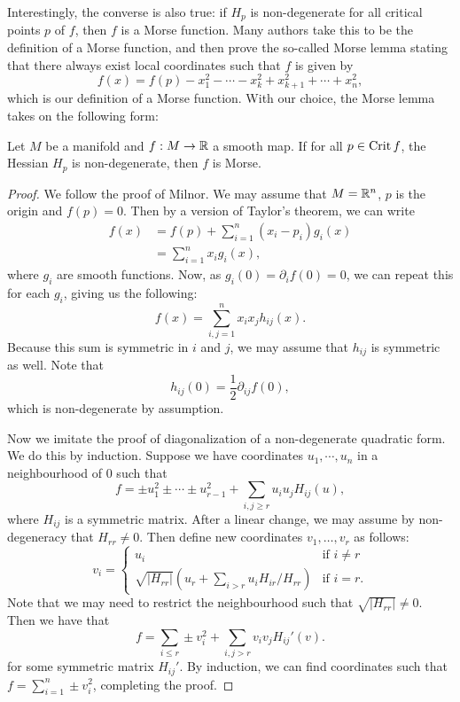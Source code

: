 Interestingly, the converse is also true: if $H_p$ is non-degenerate for all critical points  $p$ of $f$, then  $f$ is a Morse function.
Many authors take this to be the definition of a Morse function, and then prove the so-called Morse lemma stating that there always exist local coordinates such that $f$ is given by
\[
    f(x) = f(p) - x_1^2 - \cdots - x_k^2 + x_{k+1}^2 + \cdots + x_n^2
,\] 
which is our definition of a Morse function. 
With our choice, the Morse lemma takes on the following form:
\begin{lemma}
    Let $M$ be a manifold and $f: M \to  \mathbb{R}$ a smooth map.
    If for all $p \in \operatorname{Crit} f$, the Hessian $H_p$ is non-degenerate, then $f$ is Morse.
\end{lemma}
\begin{proof}
    We follow the proof of Milnor.
    We may assume that $M = \mathbb{R}^{n}$, $p$ is the origin and $f(p) = 0$.
    Then by a version of Taylor's theorem, we can write
    \begin{align*}
        f(x)  &= f(p) + \sum_{i=1}^{n} (x_i - p_i) g_i (x)\\
              &= \sum_{i=1}^{n} x_i g_i(x)
    ,\end{align*} 
    where $g_i$ are smooth functions. 
    Now, as $g_i(0) = \partial_i f (0) = 0$, we can repeat this for each  $g_i$, giving us the following:
    \[
        f(x) = \sum_{i, j= 1}^{n} x_i x_j h_{ij}(x)
    .\] 
    Because this sum is symmetric in $i$ and  $j$, we may assume that  $h_{ij}$ is symmetric as well.
    Note that
    \[
        h_{ij}(0) = \frac{1}{2} \partial_{ij} f(0)
    ,\]
    which is non-degenerate by assumption.

    Now we imitate the proof of diagonalization of a non-degenerate quadratic form.
    We do this by induction.
    Suppose we have coordinates $u_1, \cdots, u_n$ in a neighbourhood of $0$ such that
    \[
        f = \pm u_1^2 \pm \cdots \pm u_{r-1}^2 + \sum_{i,j\ge r} u_i u_j H_{ij}(u)
    ,\] 
    where $H_{ij}$ is a symmetric matrix.
    After a linear change, we may assume by non-degeneracy that $H_{rr} \neq 0$.
    Then define new coordinates $ v_1, \ldots, v_r$ as follows:
    \[
        v_i = \begin{cases}
            u_i & \text{if $i \neq r$}\\
            \sqrt{|H_{rr}|} (u_r + \sum_{i > r} u_i H_{ir} / H_{rr}) & \text{if $i = r$.}
        \end{cases}
    \] 
    Note that we may need to restrict the neighbourhood such that $\sqrt{|H_{rr}|} \neq 0$.
    Then we have that
    \[
        f = \sum_{i\le r} \pm v_i^2 + \sum_{i,j > r} v_i v_j H_{ij}'(v)
    .\] 
    for some symmetric matrix $H_{ij}'$.
    By induction, we can find coordinates such that
    $f = \sum_{i=1}^{n} \pm v_i^2$, completing the proof.
\end{proof}

